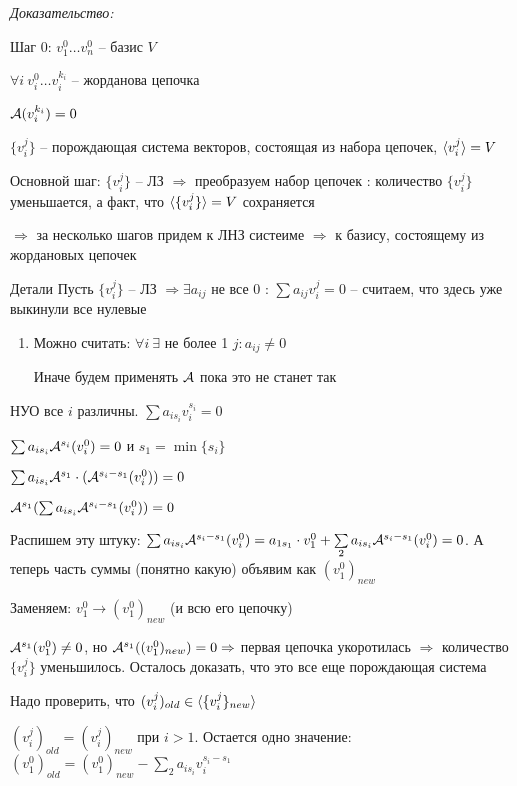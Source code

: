 \documentclass[12pt]{article}
\begin{document}
\textit{Доказательство:}

Шаг 0: $v_1^0 \ldots v_n^0$ -- базис $V$

$\forall i\ v_i^0 \ldots v_i^{k_i}$ -- жорданова цепочка

$\mathcal{A}(v_i^{k_i}) = 0$

$\{ v_i^j \}$ -- порождающая система векторов, состоящая из набора цепочек, $\langle v_i^j \rangle = V$

Основной шаг: $\{v_i^j \}$ -- ЛЗ $\Rightarrow$ преобразуем набор цепочек : количество $\{v_i^j\}$ уменьшается, а факт, что $\langle \{v_i^j\} \rangle = V$ сохраняется

$\Rightarrow$ за несколько шагов придем к ЛНЗ систеиме $\Rightarrow$ к базису, состоящему из жордановых цепочек

\begin{nota}{Детали}
    Пусть $\{v_i^j\}$ -- ЛЗ $\Rightarrow \exists a_{ij}$ не все 0 : $\sum a_{ij}v_i^j = 0$ -- считаем, что здесь уже выкинули все нулевые

    \begin{enumerate}
        \item Можно считать: $\forall i\ \exists$ не более 1 $j : a_{ij} \neq 0$
        
        Иначе будем применять $\mathcal{A}$ пока это не станет так 
    \end{enumerate}
\end{nota}

НУО все $i$ различны. $\sum a_{is_i}v_i^{s_i} = 0$

$\sum a_{is_i}\mathcal{A}^{s_i}(v_i^0) = 0$ и $s_1 = \min \{s_i\}$

$\sum a_{is_i}\mathcal{A}^{s_1}\cdot(\mathcal{A}^{s_i - s_1}(v_i^0)) = 0$

$\mathcal{A}^{s_1}(\sum a_{is_i}\mathcal{A}^{s_i - s_1}(v_i^0)) = 0$

Распишем эту штуку: $\sum a_{is_i}\mathcal{A}^{s_i - s_1}(v_i^0) = a_{1s_1} \cdot v_1^0 + \sum\limits_2 a_{is_i}\mathcal{A}^{s_i - s_1}(v_i^0) = 0$. А теперь часть суммы (понятно какую) объявим как $(v_1^0)_{new}$

Заменяем: $v_1^0 \to (v_1^0)_{new}$ (и всю его цепочку)

$\mathcal{A}^{s_1}(v_1^0) \neq 0$, но $\mathcal{A}^{s_1}((v_1^0)_{new}) = 0 \Rightarrow$ первая цепочка укоротилась $\Rightarrow$ количество $\{v_i^j\}$ уменьшилось. Осталось доказать, что это все еще порождающая система

Надо проверить, что $(v_i^j)_{old} \in \langle \{v_i^j\}_{new} \rangle$

$(v_i^j)_{old} = (v_i^j)_{new}$ при $i > 1$. Остается одно значение: $(v_1^0)_{old} = (v_1^0)_{new} - \sum\limits_2 a_{is_i}v_i^{s_i - s_1}$
\end{document}
